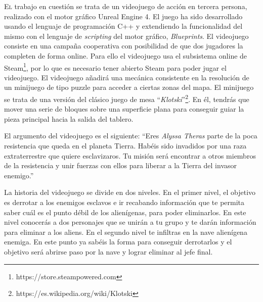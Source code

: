 \lettrine[lines=2,findent=2pt,nindent=3pt,loversize=0.1]{\textcolor[gray]{0.4}{E}}{l} trabajo en cuestión se trata de un videojuego de acción en tercera persona, realizado con el motor gráfico Unreal Engine 4. El juego ha sido desarrollado usando el lenguaje de programación C++ y extendiendo la funcionalidad del mismo con el lenguaje de \textit{scripting} del motor gráfico, \textit{Blueprints}. El videojuego consiste en una campaña cooperativa con posibilidad de que dos jugadores la completen de forma online. Para ello el videojuego usa el subsistema online de Steam\footnote{https://store.steampowered.com}, por lo que es necesario tener abierto Steam para poder jugar el videojuego. El videojuego añadirá una mecánica consistente en la resolución de un minijuego de tipo puzzle para acceder a ciertas zonas del mapa. El minijuego se trata de una versión del clásico juego de mesa ``\textit{Klotski}''\footnote{https://es.wikipedia.org/wiki/Klotski}. En él, tendrás que mover una serie de bloques sobre una superficie plana para conseguir guiar la pieza principal hacia la salida del tablero.

El argumento del videojuego es el siguiente: ``Eres \textit{Alyssa Theras} parte de la poca resistencia que queda en el planeta Tierra. Habéis sido invadidos por una raza extraterrestre que quiere esclavizaros. Tu misión será encontrar a otros miembros de la resistencia y unir fuerzas con ellos para liberar a la Tierra del invasor enemigo.''

La historia del videojuego se divide en dos niveles. En el primer nivel, el objetivo es derrotar a los enemigos esclavos e ir recabando información que te permita saber cuál es el punto débil de los alienígenas, para poder eliminarlos. En este nivel conocerás a dos personajes que se unirán a tu grupo y te darán información para eliminar a los aliens. En el segundo nivel te infiltras en la nave alienígena enemiga. En este punto ya sabéis la forma para conseguir derrotarlos y el objetivo será abrirse paso por la nave y lograr eliminar al jefe final.